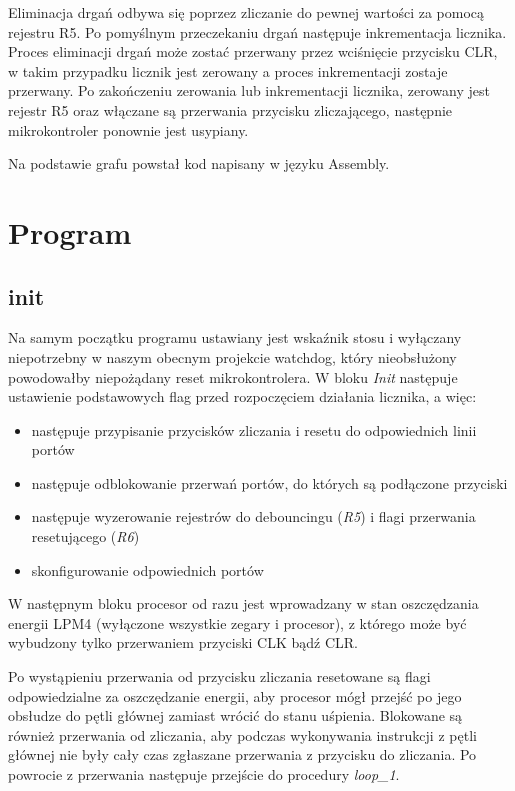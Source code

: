 \documentclass[fleqn]{article}
\begin{document}
Eliminacja drgań odbywa się poprzez zliczanie do pewnej wartości za pomocą rejestru R5. Po pomyślnym przeczekaniu drgań następuje inkrementacja licznika. Proces eliminacji drgań może zostać przerwany przez wciśnięcie przycisku CLR, w takim przypadku licznik jest zerowany a proces inkrementacji zostaje przerwany. Po zakończeniu zerowania lub inkrementacji licznika, zerowany jest rejestr R5 oraz włączane są przerwania przycisku zliczającego, następnie mikrokontroler ponownie jest usypiany.

Na podstawie grafu powstał kod napisany w języku Assembly.

\pagebreak

\section{Program}
\subsection{init}

		Na samym początku programu ustawiany jest wskaźnik stosu i wyłączany niepotrzebny w naszym obecnym projekcie watchdog, który nieobsłużony powodowałby niepożądany reset mikrokontrolera.
		W bloku \textit{Init} następuje ustawienie podstawowych flag przed rozpoczęciem działania licznika, a więc:
		\begin{itemize}
			\item następuje przypisanie przycisków zliczania i resetu do odpowiednich linii portów
			\item następuje odblokowanie przerwań portów, do których są podłączone przyciski
			\item następuje wyzerowanie rejestrów do debouncingu (\textit{R5}) i flagi przerwania resetującego (\textit{R6})
			\item skonfigurowanie odpowiednich portów
		\end{itemize}

		W następnym bloku procesor od razu jest wprowadzany w stan oszczędzania energii LPM4 (wyłączone wszystkie zegary i procesor), z którego może być wybudzony tylko przerwaniem przyciski CLK bądź CLR.

		Po wystąpieniu przerwania od przycisku zliczania resetowane są flagi odpowiedzialne za oszczędzanie energii, aby procesor mógł przejść po jego obsłudze do pętli głównej zamiast wrócić do stanu uśpienia. Blokowane są również przerwania od zliczania, aby podczas wykonywania instrukcji z pętli głównej nie były cały czas zgłaszane przerwania z przycisku do zliczania. Po powrocie z przerwania następuje przejście do procedury \textit{loop\_1}.
\end{document}
